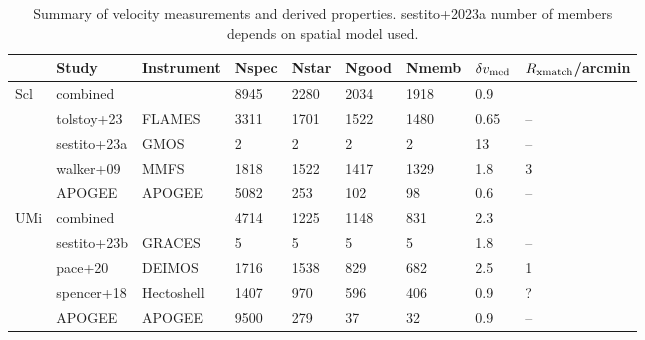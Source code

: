\begin{table*}[t]
\centering
\caption{Summary of velocity measurements and derived properties. sestito+2023a number of members depends on spatial model used.}
\begin{tabular}{lllllllll}
\toprule
 & Study & Instrument & Nspec & Nstar & Ngood & Nmemb & $\delta v_{\rm med}$ & $R_{\rm xmatch}$/arcmin\\
\midrule
Scl & combined &  & 8945 & 2280 & 2034 & 1918 & 0.9 & \\
 & tolstoy+23 & FLAMES & 3311 & 1701 & 1522 & 1480 & 0.65 & –\\
 & sestito+23a & GMOS & 2 & 2 & 2 & 2 & 13 & –\\
 & walker+09 & MMFS & 1818 & 1522 & 1417 & 1329 & 1.8 & 3\\
 & APOGEE & APOGEE & 5082 & 253 & 102 & 98 & 0.6 & –\\
UMi & combined &  & 4714 & 1225 & 1148 & 831 & 2.3 & \\
 & sestito+23b & GRACES & 5 & 5 & 5 & 5 & 1.8 & –\\
 & pace+20 & DEIMOS & 1716 & 1538 & 829 & 682 & 2.5 & 1\\
 & spencer+18 & Hectoshell & 1407 & 970 & 596 & 406 & 0.9 & ?\\
 & APOGEE & APOGEE & 9500 & 279 & 37 & 32 & 0.9 & –\\
\bottomrule
\end{tabular}
\end{table*}

